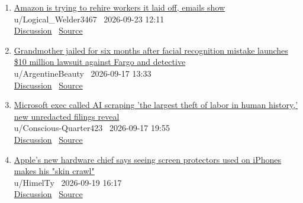 \documentclass[11pt,a4paper]{article}
\begin{document}
\begin{enumerate}
  \item \href{https://www.reddit.com/r/technology/comments/1wo49k1/amazon_is_trying_to_rehire_workers_it_laid_off/}{Amazon is trying to rehire workers it laid off, emails show}\\ {\small u/Logical\_Welder3467 \textbullet\ 2026-09-23 12:11}\\ {\small \href{https://www.reddit.com/r/technology/comments/1wo49k1/amazon_is_trying_to_rehire_workers_it_laid_off/}{Discussion} \textbullet\ \href{https://www.businessinsider.com/amazon-boomerang-hiring-recruiting-former-employees-laid-off-2026-9}{Source}}
  \item \href{https://www.reddit.com/r/technology/comments/1wiu59k/grandmother_jailed_for_six_months_after_facial/}{Grandmother jailed for six months after facial recognition mistake launches \$10 million lawsuit against Fargo and detective}\\ {\small u/ArgentineBeauty \textbullet\ 2026-09-17 13:33}\\ {\small \href{https://www.reddit.com/r/technology/comments/1wiu59k/grandmother_jailed_for_six_months_after_facial/}{Discussion} \textbullet\ \href{https://www.techspot.com/news/113883-grandmother-jailed-after-facial-recognition-mistake-launches-10.html}{Source}}
  \item \href{https://www.reddit.com/r/technology/comments/1wj4gkx/microsoft_exec_called_ai_scraping_the_largest/}{Microsoft exec called AI scraping 'the largest theft of labor in human history,' new unredacted filings reveal}\\ {\small u/Conscious-Quarter423 \textbullet\ 2026-09-17 19:55}\\ {\small \href{https://www.reddit.com/r/technology/comments/1wj4gkx/microsoft_exec_called_ai_scraping_the_largest/}{Discussion} \textbullet\ \href{https://techcrunch.com/2026/09/17/microsoft-exec-called-ai-scraping-the-largest-theft-of-labor-in-human-history-new-unredacted-filings-reveal/}{Source}}
  \item \href{https://www.reddit.com/r/technology/comments/1wkqcsy/apples_new_hardware_chief_says_seeing_screen/}{Apple's new hardware chief says seeing screen protectors used on iPhones makes his "skin crawl"}\\ {\small u/HimelTy \textbullet\ 2026-09-19 16:17}\\ {\small \href{https://www.reddit.com/r/technology/comments/1wkqcsy/apples_new_hardware_chief_says_seeing_screen/}{Discussion} \textbullet\ \href{https://www.techspot.com/news/113910-apple-new-hardware-chief-seeing-screen-protectors-used.html}{Source}}

\end{enumerate}
\end{document}
